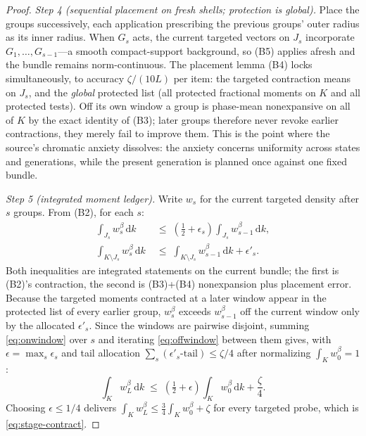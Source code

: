 \documentclass[11pt]{article}
\theoremstyle{remark}
\theoremstyle{definition}
\newcommand{\dd}{\,\mathrm d}
\begin{document}
\begin{proof}
\emph{Step 4 (sequential placement on fresh shells; protection is global).}
Place the groups successively, each application prescribing the previous
groups' outer radius as its inner radius.  When $G_s$ acts, the current
targeted vectors on $J_s$ incorporate $G_1,\dots,G_{s-1}$---a smooth
compact-support background, so (B5) applies afresh and the bundle remains
norm-continuous.  The placement lemma (B4) locks simultaneously, to accuracy
$\zeta/(10L)$ per item: the targeted contraction means on $J_s$, and the
\emph{global} protected list (all protected fractional moments on $K$ and all
protected tests).  Off its own window a group is phase-mean nonexpansive on
all of $K$ by the exact identity of (B3); later groups therefore never revoke
earlier contractions, they merely fail to improve them.  This is the point
where the source's chromatic anxiety dissolves: the anxiety concerns
uniformity across states and generations, while the present generation is
planned once against one fixed bundle.

\emph{Step 5 (integrated moment ledger).}
Write $w_s$ for the current targeted density after $s$ groups.  From (B2),
for each $s$:
\begin{align}
 \int_{J_s} w_s^\beta\dd k
 &\;\leq\;
 \left(\tfrac12+\epsilon_s\right)
 \int_{J_s} w_{s-1}^\beta\dd k ,
 \label{eq:onwindow}\\
 \int_{K\setminus J_s} w_s^\beta\dd k
 &\;\leq\;
 \int_{K\setminus J_s} w_{s-1}^\beta\dd k+\epsilon'_s .
 \label{eq:offwindow}
\end{align}
Both inequalities are integrated statements on the current bundle; the first
is (B2)'s contraction, the second is (B3)+(B4) nonexpansion plus placement
error.  Because the targeted moments contracted at a later window appear in
the protected list of every earlier group, $w_s^\beta$ exceeds
$w_{s-1}^\beta$ off the current window only by the allocated $\epsilon'_s$.
Since the windows are pairwise disjoint, summing \eqref{eq:onwindow} over $s$
and iterating \eqref{eq:offwindow} between them gives, with
$\epsilon=\max_s\epsilon_s$ and tail allocation $\sum_s(\epsilon'_s\text{-tail})
\leq\zeta/4$ after normalizing $\int_Kw_0^\beta=1$:
\begin{equation}
 \int_K w_L^\beta\dd k
 \;\leq\;
 \left(\tfrac12+\epsilon\right)\int_K w_0^\beta\dd k+\frac{\zeta}{4}.
 \label{eq:ledger}
\end{equation}
Choosing $\epsilon\leq1/4$ delivers
$\int_Kw_L^\beta\leq\tfrac34\int_Kw_0^\beta+\zeta$ for every targeted probe,
which is \eqref{eq:stage-contract}.


\end{proof}
\end{document}
